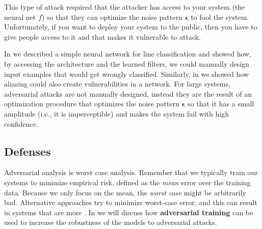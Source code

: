 This type of attack required that the attacker has access to your system (the neural net $f$) so that they can optimize the noise pattern $\mathbf{\epsilon}$ to fool the system. Unfortunately, if you want to deploy your system to the public, then you have to give people access to it and that makes it vulnerable to attack.

In \chap{\ref{chapter:neural_nets}} we described a simple neural network for line classification and showed how, by accessing the architecture and the learned filters, we could manually design input examples that would get wrongly classified. Similarly, in \chap{\ref{chap:downsampling_and_upsampling}} we showed how aliasing could also create vulnerabilities in a network. For large systems, adversarial attacks are not manually designed, instead they are the result of an optimization procedure that optimizes the noise pattern $\mathbf{\epsilon}$ so that it has a small amplitude (i.e., it is imperceptible) and makes the system fail with high confidence. 

\subsection{Defenses}

Adversarial analysis is worst case analysis. Remember that we typically train our systems to minimize empirical risk, defined as the \textit{mean} error over the training data. Because we only focus on the mean, the \textit{worst case} might be arbitrarily bad. Alternative approaches try to minimize worst-case error, and this can result in systems that are more .
In \chap{\ref{chapter:data_augmentation}} we will discuss how {\bf adversarial training} can be used to increase the robustness of the models to adversarial attacks. 









